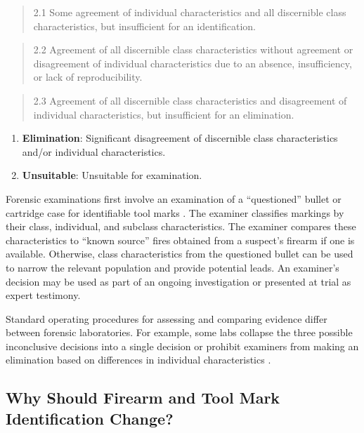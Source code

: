 \documentclass[11pt,]{isuthesis}
\begin{document}
\begin{quote}
2.1 Some agreement of individual characteristics and all discernible class characteristics, but insufficient for an identification.
\end{quote}

\begin{quote}
2.2 Agreement of all discernible class characteristics without agreement or disagreement of individual characteristics due to an absence, insufficiency, or lack of reproducibility.
\end{quote}

\begin{quote}
2.3 Agreement of all discernible class characteristics and disagreement of individual characteristics, but insufficient for an elimination.
\end{quote}

\begin{enumerate}
\def\labelenumi{\arabic{enumi}.}
\setcounter{enumi}{2}
\item
  \textbf{Elimination}: Significant disagreement of discernible class characteristics and/or individual characteristics.
\item
  \textbf{Unsuitable}: Unsuitable for examination.
\end{enumerate}

Forensic examinations first involve an examination of a ``questioned'' bullet or cartridge case for identifiable tool marks \citep{Thompson2017}.
The examiner classifies markings by their class, individual, and subclass characteristics.
The examiner compares these characteristics to ``known source'' fires obtained from a suspect's firearm if one is available.
Otherwise, class characteristics from the questioned bullet can be used to narrow the relevant population and provide potential leads.
An examiner's decision may be used as part of an ongoing investigation or presented at trial as expert testimony.

Standard operating procedures for assessing and comparing evidence differ between forensic laboratories.
For example, some labs collapse the three possible inconclusive decisions into a single decision \citep{Neuman2022} or prohibit examiners from making an elimination based on differences in individual characteristics \citep{Duez2017}.

\hypertarget{why-should-firearm-and-tool-mark-identification-change}{%
\subsection{Why Should Firearm and Tool Mark Identification Change?}\label{why-should-firearm-and-tool-mark-identification-change}}
\end{document}
